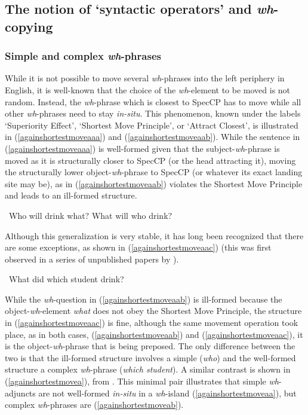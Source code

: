 \subsection{The notion of `syntactic operators' and \textit{wh}-copying}\label{syntaxoperators}
\subsubsection{Simple and complex \textit{wh}-phrases}
While it is not possible to move several \textit{wh}-phrases into the left periphery in English, it is well-known that the choice of the \textit{wh}-element to be moved is not random. Instead, the \textit{wh}-phrase which is closest to SpecCP has to move while all other \textit{wh}-phrases need to stay \textit{in-situ}. This phenomenon, known under the labels `Superiority Effect', `Shortest Move Principle', or `Attract Closest', is illustrated in (\ref{againshortestmoveaaa}) and (\ref{againshortestmoveaab}). While the sentence in (\ref{againshortestmoveaaa}) is well-formed given that the subject-\textit{wh}-phrase is moved as it is structurally closer to SpecCP (or the head attracting it), moving the structurally lower object-\textit{wh}-phrase to SpecCP (or whatever its exact landing site may be), as in (\ref{againshortestmoveaab}) violates the Shortest Move Principle and leads to an ill-formed structure.

\begin{exe}
\ex\label{againshortestmove}\begin{xlist}
\ex \textcolor{white}{*}Who will drink what? \label{againshortestmoveaaa}
\ex *What will who drink? \label{againshortestmoveaab}
\end{xlist}
\end{exe}

\noindent Although this generalization is very stable, it has long been recognized that there are some exceptions, as shown in (\ref{againshortestmoveaac}) (this was first observed in a series of unpublished papers by \citealt{reinhart1986mimeo, reinhart1987mimeo, reinhart1990mimeo}).

\begin{exe}
\ex \textcolor{white}{*}What did which student drink? \label{againshortestmoveaac}
\end{exe}

\noindent While the \textit{wh}-question in (\ref{againshortestmoveaab}) is ill-formed because the object-\textit{wh}-element \textit{what} does not obey the Shortest Move Principle, the structure in (\ref{againshortestmoveaac}) is fine, although the same movement operation took place, as in both cases, (\ref{againshortestmoveaab}) and (\ref{againshortestmoveaac}), it is the object-\textit{wh}-phrase that is being preposed. The only difference between the two is that the ill-formed structure involves a simple (\textit{who}) and the well-formed structure a complex \textit{wh}-phrase (\textit{which student}). A similar contrast is shown in (\ref{againshortestmovea}), from \citet[4--5]{reinhart1990mimeo}. This minimal pair illustrates that simple \textit{wh}-adjuncts are not well-formed \textit{in-situ} in a \textit{wh}-island (\ref{againshortestmoveaa}), but complex \textit{wh}-phrases are (\ref{againshortestmoveab}). 

